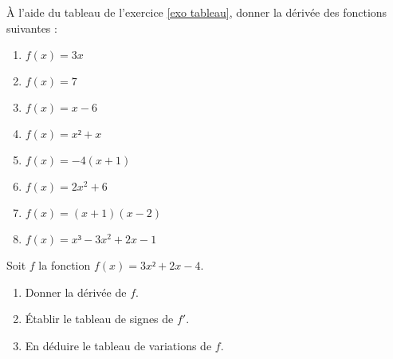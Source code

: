 \documentclass[
	classe=$1^{ere}STI2D$
]{exercice}
\begin{document}
\begin{exercice}
	À l'aide du tableau de l'exercice \ref{exo tableau}, donner la dérivée des fonctions suivantes :

	\begin{multicols}{2}
		\begin{enumerate}
			\item $f(x) = 3x$
			\item $f(x) = 7$
			\item $f(x) = x - 6$
			\item $f(x) = x² + x$
			\item $f(x) = -4(x + 1)$
			\item $f(x) = 2x^2 + 6$
			\item $f(x) = (x+1)(x - 2)$
			\item $f(x) = x³ - 3x^2	+ 2x - 1$
		\end{enumerate}
	\end{multicols}
\end{exercice}

\begin{exercice}
	Soit $f$ la fonction $f(x) = 3x² + 2x - 4$.

	\begin{enumerate}
		\item Donner la dérivée de $f$.
		\item Établir le tableau de signes de $f'$.
		\item En déduire le tableau de variations de $f$.
	\end{enumerate}
\end{exercice}
\end{document}
